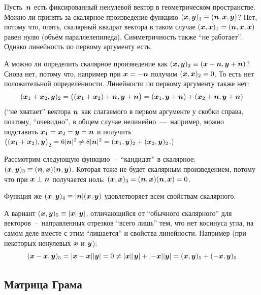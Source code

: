 \documentclass[a4paper,12pt]{article}
\begin{document}
  \begin{example}[\# 25.1]
    Пусть~$\boldsymbol n$ есть фиксированный ненулевой вектор в геометрическом пространстве.
    Можно ли принять за скалярное произведение функцию $(\bds x, \bds y)_1 \hm\equiv (\bds n, \bds x, \bds y)$?
    Нет, потому что, опять, скалярный квадрат вектора в таком случае $(\bds x, \bds x)_1 \hm= (\bds n, \bds x, \bds x)$ равен нулю (объём параллелепипеда).
    Симметричность также ``не работает''.
    Однако линейность по первому аргументу есть.
    
    А можно ли определить скалярное произведение как $(\bds x, \bds y)_2 \hm\equiv (\bds x \hm+ \bds n, \bds y \hm+ \bds n)$?
    Снова нет, потому что, например при $\bds x \hm= -{\bds n}$ получим $(\bds x, \bds x)_2 \hm= 0$.
    То есть нет положительной определённости.
    Линейности по первому аргументу также нет:
    \[
      (\boldsymbol x_1 + \boldsymbol x_2, \boldsymbol y)_2
      = \bigl((\boldsymbol x_1 + \boldsymbol x_2) + \boldsymbol n, \boldsymbol y + \boldsymbol n\bigr)
      = (\boldsymbol x_1, \boldsymbol y + \boldsymbol n) + (\boldsymbol x_2 + \boldsymbol n, \boldsymbol y + \boldsymbol n)
    \]
    (``не хватает'' вектора $\boldsymbol n$ как слагаемого в первом аргументе у скобки справа, поэтому, ``очевидно'', в общем случае нелинейно~---~например, можно подставить $\bds x_1 \hm= \bds x_2 \hm= \bds y \hm= \bds n$ и получить $\bigl((\bds x_1 \hm+ \bds x_2), \bds y\bigr)_2 \hm= 6 |\bds n|^2 \hm{\not=} 8 |\bds n|^2 \hm= (\bds x_1, \bds y)_2 \hm+ (\bds x_2, \bds y)_2$.)
    
    Рассмотрим следующую функцию~--~``кандидат'' в скалярное: $(\bds x, \bds y)_3 \hm\equiv (\bds n, \bds x)(\bds n, \bds y)$.
    Которая тоже не будет скалярным произведением, потому что при $\bds x \hm\perp \bds n$ получается ноль: $(\bds x, \bds x)_3 \hm= (\bds n, \bds x) (\bds n, \bds x) \hm= 0$.
    
    Функция же $(\bds x, \bds y)_4 \hm\equiv |\bds n| (\bds x, \bds y)$ удовлетворяет всем свойствам скалярного.
    
    А вариант $(\bds x, \bds y)_5 \hm\equiv |\bds x| |\bds y|$, отличающийся от ``обычного скалярного'' для векторов~--~направленных отрезков ``всего лишь'' тем, что нет косинуса угла, на самом деле вместе с этим ``лишается'' и свойства линейности.
    Например (при некоторых ненулевых $\boldsymbol x$ и $\boldsymbol y$):
    \[
      (\boldsymbol x - \boldsymbol x, \boldsymbol y)_5 = |\boldsymbol x - \boldsymbol x| |\boldsymbol y| = 0
      \not= |\boldsymbol x| |\boldsymbol y| + |{-}{\boldsymbol x}| |\boldsymbol y| = (\boldsymbol x, \boldsymbol y)_5 + ({-}{\boldsymbol x}, \boldsymbol y)_5
    \]
  \end{example}
  
  
  \subsection{Матрица Грама}
  
\end{document}
